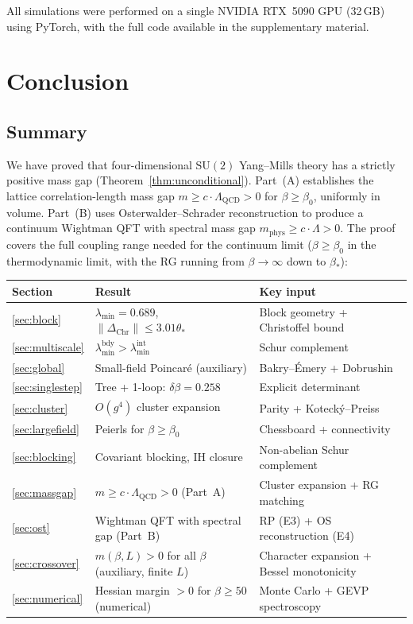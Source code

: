 \documentclass[11pt]{article}
\theoremstyle{definition}
\newcommand{\SU}{\mathrm{SU}}
\newcommand{\Lam}{\Lambda_{\mathrm{QCD}}}
\begin{document}
All simulations were performed on a single NVIDIA RTX~5090 GPU
(32\,GB) using PyTorch, with the full code available
in the supplementary material.

\section{Conclusion}\label{sec:conclusion}

\subsection{Summary}

We have proved that four-dimensional $\SU(2)$ Yang--Mills theory
has a strictly positive mass gap
(Theorem~\ref{thm:unconditional}).  Part~(A) establishes
the lattice correlation-length mass gap
$m\ge c\cdot\Lam>0$ for $\beta\ge\beta_0$, uniformly in volume.
Part~(B) uses Osterwalder--Schrader reconstruction to produce
a continuum Wightman QFT with spectral mass gap
$m_{\mathrm{phys}}\ge c\cdot\Lambda>0$.
The proof covers the full coupling range needed
for the continuum limit ($\beta\ge\beta_0$ in the thermodynamic limit,
with the RG running from $\beta\to\infty$ down to $\beta_*$):

\begin{center}
\begin{tabular}{lll}
\toprule
\textbf{Section} & \textbf{Result} & \textbf{Key input}\\
\midrule
\ref{sec:block} & $\lambda_{\min}=0.689$, $\|\Delta_{\mathrm{Chr}}\|\le 3.01\theta_*$ &
Block geometry + Christoffel bound\\
\ref{sec:multiscale} & $\lambda_{\min}^{\mathrm{bdy}}>
\lambda_{\min}^{\mathrm{int}}$ & Schur complement\\
\ref{sec:global} & Small-field Poincar\'e (auxiliary) & Bakry--\'Emery + Dobrushin\\
\ref{sec:singlestep} & Tree + 1-loop: $\delta\beta=0.258$ &
Explicit determinant\\
\ref{sec:cluster} & $O(g^4)$ cluster expansion & Parity +
Koteck\'y--Preiss\\
\ref{sec:largefield} & Peierls for $\beta\ge\beta_0$ & Chessboard +
connectivity\\
\ref{sec:blocking} & Covariant blocking, IH closure &
Non-abelian Schur complement\\
\ref{sec:massgap} & $m\ge c\cdot\Lam>0$ (Part~A) &
Cluster expansion + RG matching\\
\ref{sec:ost} & Wightman QFT with spectral gap (Part~B) &
RP (E3) + OS reconstruction (E4)\\
\ref{sec:crossover} & $m(\beta,L)>0$ for all $\beta$ (auxiliary, finite $L$) &
Character expansion + Bessel monotonicity\\
\ref{sec:numerical} & Hessian margin $>0$ for $\beta\ge 50$ (numerical) &
Monte Carlo + GEVP spectroscopy\\
\bottomrule
\end{tabular}
\end{center}
\end{document}

